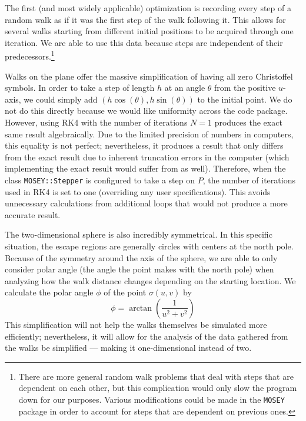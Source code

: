 \documentclass[12pt]{article}
\begin{document}
		The first (and most widely applicable) optimization is recording every step of a random walk as if it was the first step of the walk following it.
		This allows for several walks starting from different initial positions to be acquired through one iteration.
		We are able to use this data because steps are independent of their predecessors.\footnote{There are more general random walk problems that deal with steps that are dependent on each other, but this complication would only slow the program down for our purposes. Various modifications could be made in the \texttt{MOSEY} package in order to account for steps that are dependent on previous ones.}
		
		Walks on the plane offer the massive simplification of having all zero Christoffel symbols.
		In order to take a step of length $h$ at an angle $\theta$ from the positive $u$-axis, we could simply add $(h\cos(\theta), h\sin(\theta))$ to the initial point.
		We do not do this directly because we would like uniformity across the code package.
		However, using RK4 with the number of iterations $N = 1$ produces the exact same result algebraically.
		Due to the limited precision of numbers in computers, this equality is not perfect; nevertheless, it produces a result that only differs from the exact result due to inherent truncation errors in the computer (which implementing the exact result would suffer from as well).
		Therefore, when the class \texttt{MOSEY::Stepper} is configured to take a step on $P$, the number of iterations used in RK4 is set to one (overriding any user specifications).
		This avoids unnecessary calculations from additional loops that would not produce a more accurate result.
		
		The two-dimensional sphere is also incredibly symmetrical.
		In this specific situation, the escape regions are generally circles with centers at the north pole.
		Because of the symmetry around the axis of the sphere, we are able to only consider polar angle (the angle the point makes with the north pole) when analyzing how the walk distance changes depending on the starting location.
		We calculate the polar angle $\phi$ of the point $\sigma(u,v)$ by
		\begin{equation*}
			\phi = \arctan\left(\frac{1}{u^2+v^2}\right)
		\end{equation*}
		This simplification will not help the walks themselves be simulated more efficiently; nevertheless, it will allow for the analysis of the data gathered from the walks be simplified --- making it one-dimensional instead of two.
		
\end{document}
